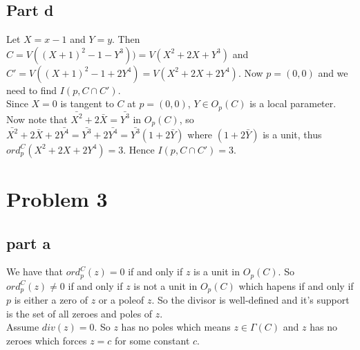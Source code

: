 \documentclass[12pt]{article}
\begin{document}
\subsection*{Part d}
Let $X=x-1$ and $Y=y$. Then $C=V((X+1)^2-1-Y^3))=V(X^2+2X+Y^3)$ and
$C'=V((X+1)^2-1+2Y^4)=V(X^2+2X+2Y^4)$. Now $p=(0,0)$ and we need to find 
$I(p,C \cap C')$.  \\
Since $X=0$ is tangent to $C$ at $p=(0,0)$, $Y \in O_p(C)$ is a local parameter. \\
Now note that $\bar{X^2}+2\bar{X}=\bar{Y^3}$ in $O_p(C)$, so
$\bar{X^2}+2\bar{X}+2\bar{Y^4}=\bar{Y^3}+2\bar{Y^4}=\bar{Y^3}(1+2\bar{Y})$
where $(1+2\bar{Y})$ is a unit, thus $ord_p^C(X^2+2X+2Y^4)=3$.
Hence $I(p,C \cap C')=3$.

\clearpage
\section*{Problem 3}
\subsection*{part a}
We have that $ord_p^C(z)=0$ if and only if $z$ is a unit in $O_p(C)$. So
 $ord_p^C(z) \not= 0$ if and only if $z$ is not a unit in $O_p(C)$ which hapens if and only if $p$ is either a zero of $z$ or a poleof $z$. So the divisor is well-defined and it's support is the set of all zeroes and poles of $z$.\\
Assume $div(z)=0$. So $z$ has no poles which means $z \in \Gamma(C)$ and $z$ has no zeroes which forces $z=c$ for some constant $c$. \\
\end{document}
